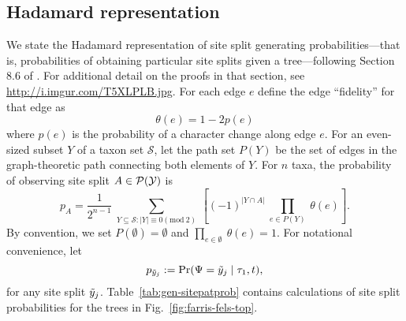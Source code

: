 \subsection*{Hadamard representation}

We state the Hadamard representation of site split generating probabilities---that is, probabilities of obtaining particular site splits given a tree---following Section 8.6 of \citet{Semple2003-em}.
For additional detail on the proofs in that section, see \url{http://i.imgur.com/T5XLPLB.jpg}.
For each edge $e$ define the edge ``fidelity'' for that edge as
\[
\theta(e) = 1-2p(e)
\]
where $p(e)$ is the probability of a character change along edge $e$.
For an even-sized subset $Y$ of a taxon set $\mathcal{S}$, let the path set $P(Y)$ be the set of edges in the graph-theoretic path connecting both elements of $Y$.
For $n$ taxa, the probability of observing site split $A\in\mathcal{P}(\mathcal{Y})$ is
\begin{equation}
\label{eq:hadamard_probability}
p_A = \frac{1}{2^{n-1}} \ \sum_{Y \subseteq \mathcal{S} : |Y| \equiv 0 (\mathrm{mod} \ 2)} \ \left[(-1)^{|Y \cap A|} \ \prod_{e\in P(Y)} \ \theta(e) \right].
\end{equation}
By convention, we set $P(\emptyset)=\emptyset$ and $\prod_{e\in\emptyset} \ \theta(e) = 1$.
For notational convenience, let
\[
p_{\tilde{y}_j} := \Pr(\Psi=\tilde{y}_j \mid \tau_1,t),
\]
for any site split $\tilde{y}_j$.
Table~\ref{tab:gen-sitepatprob} contains calculations of site split probabilities for the trees in Fig.~\ref{fig:farris-fels-top}.

